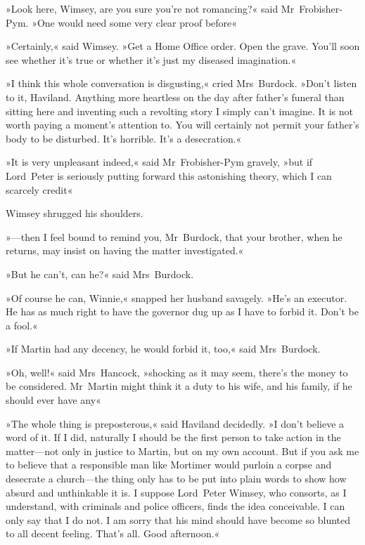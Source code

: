 »Look here, Wimsey, are you sure you're not romancing?« said Mr~Frobisher-Pym. »One would need some very clear proof before\longdash«

»Certainly,« said Wimsey. »Get a Home Office order. Open the grave. You'll soon see whether it's true or whether it's just my diseased imagination.«

»I think this whole conversation is disgusting,« cried Mrs~Burdock. »Don't listen to it, Haviland. Anything more heartless on the day after father's funeral than sitting here and inventing such a revolting story I simply can't imagine. It is not worth paying a moment's attention to. You will certainly not permit your father's body to be disturbed. It's horrible. It's a desecration.«

»It is very unpleasant indeed,« said Mr~Frobisher-Pym gravely, »but if Lord~Peter is seriously putting forward this astonishing theory, which I can scarcely credit\longdash«

Wimsey shrugged his shoulders.

»—then I feel bound to remind you, Mr~Burdock, that your brother, when he returns, may insist on having the matter investigated.«

»But he can't, can he?« said Mrs~Burdock.

»Of course he can, Winnie,« snapped her husband savagely. »He's an executor. He has as much right to have the governor dug up as I have to forbid it. Don't be a fool.«

»If Martin had any decency, he would forbid it, too,« said Mrs~Burdock.

»Oh, well!« said Mrs~Hancock, »shocking as it may seem, there's the money to be considered. Mr~Martin might think it a duty to his wife, and his family, if he should ever have any\longdash«

»The whole thing is preposterous,« said Haviland decidedly. »I don't believe a word of it. If I did, naturally I should be the first person to take action in the matter—not only in justice to Martin, but on my own account. But if you ask me to believe that a responsible man like Mortimer would purloin a corpse and desecrate a church—the thing only has to be put into plain words to show how absurd and unthinkable it is. I suppose Lord~Peter Wimsey, who consorts, as I understand, with criminals and police officers, finds the idea conceivable. I can only say that I do not. I am sorry that his mind should have become so blunted to all decent feeling. That's all. Good afternoon.«

